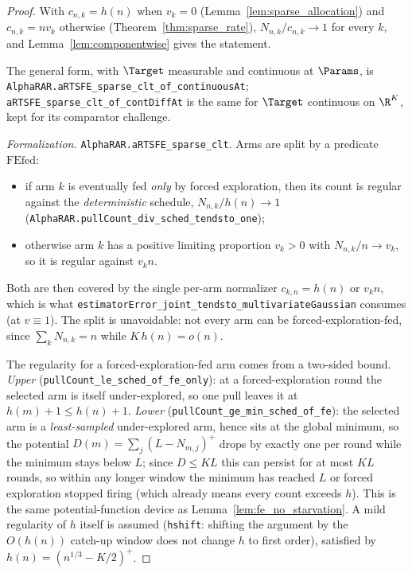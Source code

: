 \begin{proof}\leanok
{}
With $c_{n,k}=h(n)$ when $v_k=0$ (Lemma~\ref{lem:sparse_allocation}) and $c_{n,k}=nv_k$ otherwise
(Theorem~\ref{thm:sparse_rate}), $N_{n,k}/c_{n,k}\to1$ for every $k$, and
Lemma~\ref{lem:componentwise} gives the statement.

The general form, with $\Target$ measurable and continuous at $\Params$, is
\texttt{AlphaRAR.aRTSFE\_sparse\_clt\_of\_continuousAt};
\texttt{aRTSFE\_sparse\_clt\_of\_contDiffAt} is the same for $\Target$ continuous on $\R^K$, kept for
its comparator challenge.

\emph{Formalization.} \texttt{AlphaRAR.aRTSFE\_sparse\_clt}. Arms are split by a predicate
$\mathrm{FEfed}$:
\begin{itemize}
  \item if arm $k$ is eventually fed \emph{only} by forced exploration, then its count is regular
    against the \emph{deterministic} schedule, $N_{n,k}/h(n)\to1$
    (\texttt{AlphaRAR.pullCount\_div\_sched\_tendsto\_one});
  \item otherwise arm $k$ has a positive limiting proportion $v_k>0$ with $N_{n,k}/n\to v_k$, so it
    is regular against $v_kn$.
\end{itemize}
Both are then covered by the single per-arm normalizer $c_{k,n}=h(n)$ or $v_kn$, which is what
\texttt{estimatorError\_joint\_tendsto\_multivariateGaussian} consumes (at $v\equiv1$). The split is
unavoidable: not every arm can be forced-exploration-fed, since $\sum_kN_{n,k}=n$ while
$K\,h(n)=o(n)$.

The regularity for a forced-exploration-fed arm comes from a two-sided bound. \emph{Upper}
(\texttt{pullCount\_le\_sched\_of\_fe\_only}): at a forced-exploration round the selected arm is
itself under-explored, so one pull leaves it at $h(m)+1\le h(n)+1$. \emph{Lower}
(\texttt{pullCount\_ge\_min\_sched\_of\_fe}): the selected arm is a \emph{least-sampled}
under-explored arm, hence sits at the global minimum, so the potential
$D(m)=\sum_j(L-N_{m,j})^+$ drops by exactly one per round while the minimum stays below $L$; since
$D\le K L$ this can persist for at most $KL$ rounds, so within any longer window the minimum has
reached $L$ or forced exploration stopped firing (which already means every count exceeds $h$). This
is the same potential-function device as Lemma~\ref{lem:fe_no_starvation}. A mild regularity of $h$
itself is assumed (\texttt{hshift}: shifting the argument by the $O(h(n))$ catch-up window does not
change $h$ to first order), satisfied by $h(n)=(n^{1/3}-K/2)^+$.
\end{proof}

